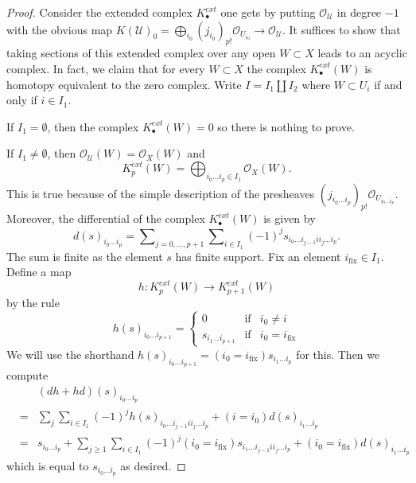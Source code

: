 \begin{proof}
Consider the extended complex $K^{ext}_\bullet$ one gets by putting
$\mathcal{O}_\mathcal{U}$ in degree $-1$ with the obvious map
$K(\mathcal{U})_0 =
\bigoplus_{i_0} (j_{i_0})_{p!}\mathcal{O}_{U_{i_0}} \to
\mathcal{O}_\mathcal{U}$.
It suffices to show that taking sections of this extended complex over
any open $W \subset X$ leads to an acyclic complex.
In fact, we claim that for every $W \subset X$ the complex
$K^{ext}_\bullet(W)$ is homotopy equivalent to the zero complex.
Write $I = I_1 \amalg I_2$ where $W \subset U_i$ if and only
if $i \in I_1$.

\medskip\noindent
If $I_1 = \emptyset$, then the complex $K^{ext}_\bullet(W) = 0$ so there is
nothing to prove.

\medskip\noindent
If $I_1 \not = \emptyset$, then
$\mathcal{O}_\mathcal{U}(W) = \mathcal{O}_X(W)$
and
$$
K^{ext}_p(W) =
\bigoplus\nolimits_{i_0 \ldots i_p \in I_1} \mathcal{O}_X(W).
$$
This is true because of the simple description of the presheaves
$(j_{i_0 \ldots i_p})_{p!}\mathcal{O}_{U_{i_0 \ldots i_p}}$.
Moreover, the differential of the complex $K^{ext}_\bullet(W)$
is given by
$$
d(s)_{i_0 \ldots i_p} =
\sum\nolimits_{j = 0, \ldots, p + 1} \sum\nolimits_{i \in I_1}
(-1)^j s_{i_0 \ldots i_{j - 1} i i_j \ldots i_p}.
$$
The sum is finite as the element $s$ has finite support.
Fix an element $i_{\text{fix}} \in I_1$. Define a map
$$
h : K^{ext}_p(W) \longrightarrow K^{ext}_{p + 1}(W)
$$
by the rule
$$
h(s)_{i_0 \ldots i_{p + 1}} =
\left\{
\begin{matrix}
0 & \text{if} & i_0 \not = i \\
s_{i_1 \ldots i_{p + 1}} & \text{if} & i_0 = i_{\text{fix}}
\end{matrix}
\right.
$$
We will use the shorthand
$h(s)_{i_0 \ldots i_{p + 1}} = (i_0 = i_{\text{fix}}) s_{i_1 \ldots i_p}$
for this. Then we compute
\begin{eqnarray*}
& & (dh + hd)(s)_{i_0 \ldots i_p} \\
& = &
\sum_j \sum_{i \in I_1} (-1)^j h(s)_{i_0 \ldots i_{j - 1} i i_j \ldots i_p}
+
(i = i_0) d(s)_{i_1 \ldots i_p} \\
& = &
s_{i_0 \ldots i_p} +
\sum_{j \geq 1}\sum_{i \in I_1}
(-1)^j (i_0 = i_{\text{fix}}) s_{i_1 \ldots i_{j - 1} i i_j \ldots i_p}
+
(i_0 = i_{\text{fix}}) d(s)_{i_1 \ldots i_p}
\end{eqnarray*}
which is equal to $s_{i_0 \ldots i_p}$ as desired.
\end{proof}


